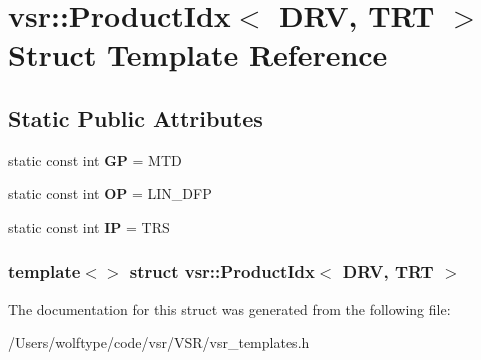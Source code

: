 \hypertarget{structvsr_1_1_product_idx_3_01_d_r_v_00_01_t_r_t_01_4}{\section{vsr\-:\-:Product\-Idx$<$ D\-R\-V, T\-R\-T $>$ Struct Template Reference}
\label{structvsr_1_1_product_idx_3_01_d_r_v_00_01_t_r_t_01_4}
}
\subsection*{Static Public Attributes}
\begin{DoxyCompactItemize}
\item 
\hypertarget{structvsr_1_1_product_idx_3_01_d_r_v_00_01_t_r_t_01_4_a3a6b14776c49565841e2a75a114d267a}{static const int {\bfseries G\-P} = M\-T\-D}\label{structvsr_1_1_product_idx_3_01_d_r_v_00_01_t_r_t_01_4_a3a6b14776c49565841e2a75a114d267a}

\item 
\hypertarget{structvsr_1_1_product_idx_3_01_d_r_v_00_01_t_r_t_01_4_ae448722679c2b3381f5e07732d52c32f}{static const int {\bfseries O\-P} = L\-I\-N\-\_\-\-D\-F\-P}\label{structvsr_1_1_product_idx_3_01_d_r_v_00_01_t_r_t_01_4_ae448722679c2b3381f5e07732d52c32f}

\item 
\hypertarget{structvsr_1_1_product_idx_3_01_d_r_v_00_01_t_r_t_01_4_a72eb7faa39d4ef5002462960179e30cc}{static const int {\bfseries I\-P} = T\-R\-S}\label{structvsr_1_1_product_idx_3_01_d_r_v_00_01_t_r_t_01_4_a72eb7faa39d4ef5002462960179e30cc}

\end{DoxyCompactItemize}
\subsubsection*{template$<$$>$ struct vsr\-::\-Product\-Idx$<$ D\-R\-V, T\-R\-T $>$}



The documentation for this struct was generated from the following file\-:\begin{DoxyCompactItemize}
\item 
/\-Users/wolftype/code/vsr/\-V\-S\-R/vsr\-\_\-templates.\-h\end{DoxyCompactItemize}
